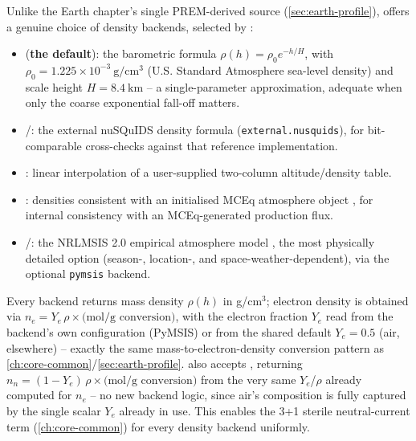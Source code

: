 \begin{implbox}
Unlike the Earth chapter's single PREM-derived source
(\cref{sec:earth-profile}),  offers a genuine
choice of density backends, selected by :
\begin{itemize}
  \item {} (\textbf{the default}): the barometric formula
    $\rho(h)=\rho_0 e^{-h/H}$, with $\rho_0=1.225\times10^{-3}\ \mathrm{g/cm^3}$
    (U.S. Standard Atmosphere sea-level density) and scale height
    $H=8.4\ \mathrm{km}$ -- a single-parameter approximation, adequate when
    only the coarse exponential fall-off matters.
  \item {}/: the external nuSQuIDS
     density formula (\texttt{external.nusquids}), for
    bit-comparable cross-checks against that reference implementation.
  \item {}: linear interpolation of a user-supplied two-column
    altitude/density table.
  \item {}: densities consistent with an initialised MCEq
    atmosphere object \parencite{Fedynitch2015MCEq}, for internal
    consistency with an MCEq-generated production flux.
  \item {}/: the NRLMSIS 2.0 empirical
    atmosphere model \parencite{Emmert2021NRLMSIS2}, the most physically
    detailed option (season-, location-, and space-weather-dependent), via
    the optional \texttt{pymsis} backend.
\end{itemize}
Every backend returns mass density $\rho(h)$ in g/cm$^3$; electron density
is obtained via $n_e=Y_e\,\rho\times\text{(mol/g conversion)}$, with the
electron fraction $Y_e$ read from the backend's own configuration (PyMSIS)
or from the shared default $Y_e=0.5$ (air, elsewhere) -- exactly the same
mass-to-electron-density conversion pattern as
\cref{ch:core-common}/\cref{sec:earth-profile}. 
also accepts , returning
$n_n=(1-Y_e)\,\rho\times\text{(mol/g conversion)}$ from the very same
$Y_e$/$\rho$ already computed for $n_e$ -- no new backend logic, since air's
composition is fully captured by the single scalar $Y_e$ already in use.
This enables the 3+1 sterile neutral-current term (\cref{ch:core-common})
for every density backend uniformly.
\end{implbox}

